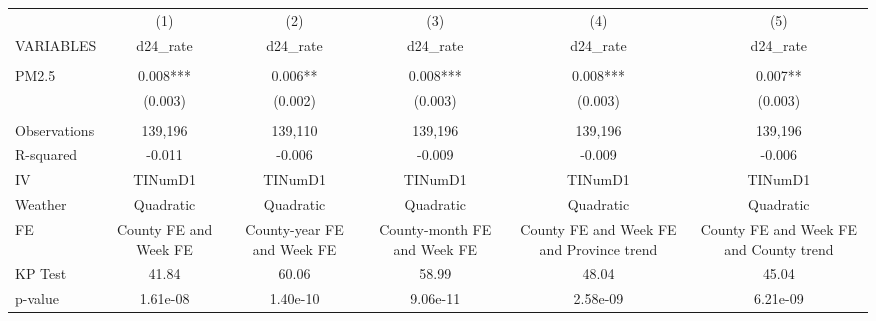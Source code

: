 \begin{tabular}{lccccc} \hline
 & (1) & (2) & (3) & (4) & (5) \\
VARIABLES & d24\_rate & d24\_rate & d24\_rate & d24\_rate & d24\_rate \\ \hline
 &  &  &  &  &  \\
PM2.5 & 0.008*** & 0.006** & 0.008*** & 0.008*** & 0.007** \\
 & (0.003) & (0.002) & (0.003) & (0.003) & (0.003) \\
 &  &  &  &  &  \\
Observations & 139,196 & 139,110 & 139,196 & 139,196 & 139,196 \\
R-squared & -0.011 & -0.006 & -0.009 & -0.009 & -0.006 \\
IV & TINumD1 & TINumD1 & TINumD1 & TINumD1 & TINumD1 \\
Weather & Quadratic & Quadratic & Quadratic & Quadratic & Quadratic \\
FE & County FE and Week FE & County-year FE and Week FE & County-month FE and Week FE & County FE and Week FE and Province trend & County FE and Week FE and County trend \\
KP Test & 41.84 & 60.06 & 58.99 & 48.04 & 45.04 \\
 p-value & 1.61e-08 & 1.40e-10 & 9.06e-11 & 2.58e-09 & 6.21e-09 \\ \hline
\end{tabular}
